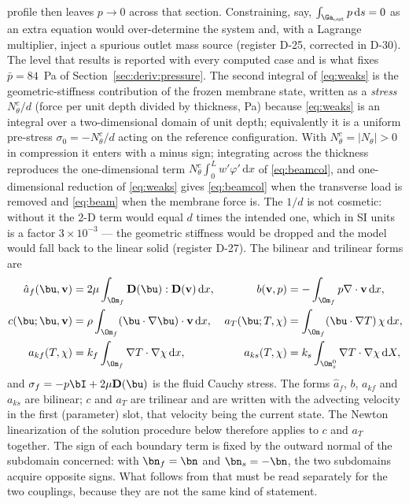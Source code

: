 profile then leaves $p\to0$ across that section. Constraining, say, $\int_{\Ga_{\mathrm{out}}}p\,
\mathrm ds=0$ as an extra equation would over-determine the system and, with a Lagrange multiplier,
inject a spurious outlet mass source (register D-25, corrected in D-30). The level that results is reported with every
computed case and is what fixes $\bar p=84$~Pa of Section~\ref{sec:deriv:pressure}.
The second integral of \eqref{eq:weaks} is the geometric-stiffness contribution of the frozen
membrane state, written as a \emph{stress} $N_\theta^c/d$ (force per unit depth divided by thickness,
\si{\pascal}) because \eqref{eq:weaks} is an integral over a two-dimensional domain of unit depth;
equivalently it is a uniform pre-stress $\sigma_0=-N_\theta^c/d$ acting on the reference
configuration. With $N_\theta^c=|N_\theta|>0$ in compression it enters with a minus sign; integrating
across the thickness reproduces the one-dimensional term $N_\theta^c\int_0^L w'\varphi'\,\mathrm dx$
of \eqref{eq:beamcol}, and one-dimensional reduction of \eqref{eq:weaks} gives \eqref{eq:beamcol}
when the transverse load is removed and \eqref{eq:beam} when the membrane force is. The $1/d$ is not
cosmetic: without it the 2-D term would equal $d$ times the intended one, which in SI units is a
factor $3\times10^{-3}$ --- the geometric stiffness would be dropped and the model would fall back
to the linear solid (register D-27).
The bilinear and trilinear forms are
\begin{align*}
\hat a_f(\bu,\mathbf v)&=2\mu\int_{\Om_f}\mathbf D(\bu):\mathbf D(\mathbf v)\,\mathrm dx,
& b(\mathbf v,p)&=-\int_{\Om_f}p\nabla\cdot\mathbf v\,\mathrm dx,\\
c(\bu;\bu,\mathbf v)&=\rho\int_{\Om_f}(\bu\cdot\nabla\bu)\cdot\mathbf v\,\mathrm dx,
& a_T(\bu;T,\chi)&=\int_{\Om_f}(\bu\cdot\nabla T)\,\chi\,\mathrm dx,\\
a_{kf}(T,\chi)&=k_f\int_{\Om_f}\nabla T\cdot\nabla\chi\,\mathrm dx,
& a_{ks}(T,\chi)&=k_s\int_{\Om_s^0}\nabla T\cdot\nabla\chi\,\mathrm dX,
\end{align*}
and $\sigma_f=-p\bI+2\mu\mathbf D(\bu)$ is the fluid Cauchy stress. The forms $\hat a_f$, $b$,
$a_{kf}$ and $a_{ks}$ are bilinear; $c$ and $a_T$ are trilinear and are written with the advecting
velocity in the first (parameter) slot, that velocity being the current state. The Newton
linearization of the solution procedure below therefore applies to $c$ and $a_T$ together. The sign
of each boundary term is fixed by the outward normal of the subdomain concerned: with $\bn_f=\bn$ and
$\bn_s=-\bn$, the two subdomains acquire opposite signs. What follows from that must be read
separately for the two couplings, because they are not the same kind of statement.

